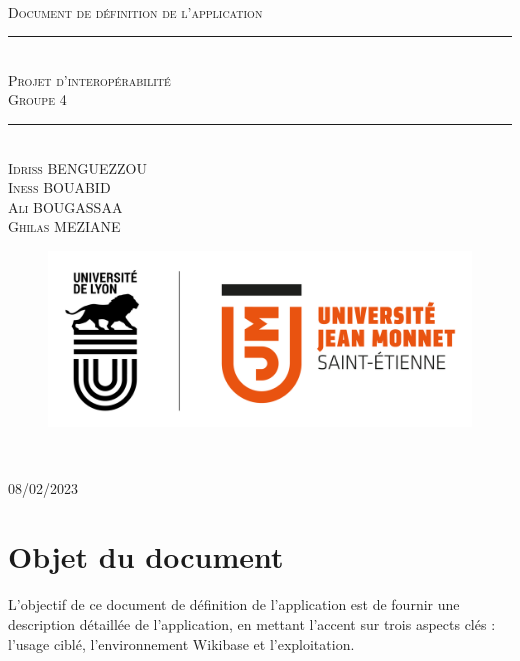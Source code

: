 \documentclass[a4paper, 12pt]{article}
\newcommand{\HRule}{\rule{\linewidth}{0.5mm}}
\begin{document}
\begin{titlepage}
  \begin{sffamily}
  \begin{center}

   
  \textsc{\LARGE }\\[2cm]

    \textsc{\Large Document de définition de l’application}

    \HRule \\[0.4cm]
    { \huge  \textsc{Projet d'interopérabilité} \\
    \textsc{\small Groupe 4}\\ [0.4cm] }
	

    \HRule \\[2cm]
    \textsc {Idriss BENGUEZZOU\\ Iness BOUABID\\Ali BOUGASSAA\\Ghilas MEZIANE }
 \begin{figure}
     \centering
    \includegraphics[scale=0.2]{logoUJM.png}
     \label{fig:ujm_logo}
 \end{figure}
   
    \

    \vfill

    {\large {} 08/02/2023}

  \end{center}
  \end{sffamily}
\end{titlepage}


\newpage
\tableofcontents

\newpage
\section{Objet du document}

L'objectif de ce document de définition de l'application est de fournir une description détaillée de l'application, en mettant l'accent sur trois aspects clés : l'usage ciblé, l'environnement Wikibase et l'exploitation.
\end{document}
